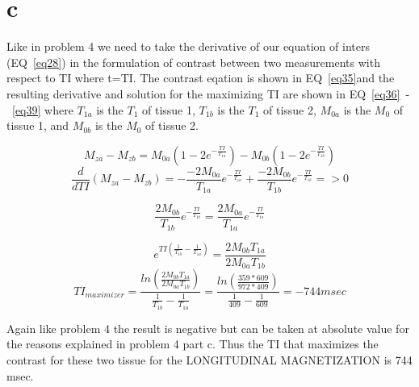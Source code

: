 \documentclass[12pt]{article}
\begin{document}
\section{c}
Like in problem 4 we need to take the derivative of our equation of inters (EQ~\ref{eq28}) in the formulation of contrast between two measurements with respect to TI where t=TI. The contrast eqation is shown in EQ~\ref{eq35}and the resulting derivative and solution for the maximizing TI are shown in EQ~\ref{eq36}~-~\ref{eq39} where $T_{1a}$ is the $T_1$ of tissue 1, $T_{1b}$ is the $T_1$ of tissue 2, $M_{0a}$ is the $M_0$ of tissue 1, and $M_{0b}$ is the $M_0$ of tissue 2.

\begin{equation}
M_{za}-M_{zb} = M_{0a}(1-2e^{-\frac{TI}{T_{1a}}})-M_{0b}(1-2e^{-\frac{TI}{T_{1b}}})
\label{eq35}
\end{equation}
\begin{equation}
\frac{d}{dTI}(M_{za}-M_{zb})= -\frac{-2M_{0a}}{T_{1a}}e^{-\frac{TI}{T_{1a}}}+\frac{-2M_{0b}}{T_{1b}}e^{-\frac{TI}{T_{1b}}} => 0
\label{eq36}
\end{equation}

\begin{equation}
\frac{2M_{0b}}{T_{1b}}e^{-\frac{TI}{T_{1b}}}=\frac{2M_{0a}}{T_{1a}}e^{-\frac{TI}{T_{1a}}}
\label{eq37}
\end{equation}

\begin{equation}
e^{TI(\frac{1}{T_{1b}}-\frac{1}{T_{1a}})}= \frac{2M_{0b}T_{1a}}{2M_{0a}T_{1b}}
\label{eq38}
\end{equation}
\begin{equation}
TI_{maximizer}= \frac{ln(\frac{2M_{0b}T_{1a}}{2M_{0a}T_{1b}})}{\frac{1}{T_{1b}}-\frac{1}{T_{1a}}} = \frac{ln(\frac{359*609}{972*409})}{\frac{1}{409}-\frac{1}{609}} = -744msec
\label{eq39}
\end{equation}

Again like problem 4 the result is negative but can be taken at absolute value for the reasons explained in problem 4 part c. Thus the TI that maximizes the contrast for these two tissue for the LONGITUDINAL MAGNETIZATION is 744 msec.
\end{document}
